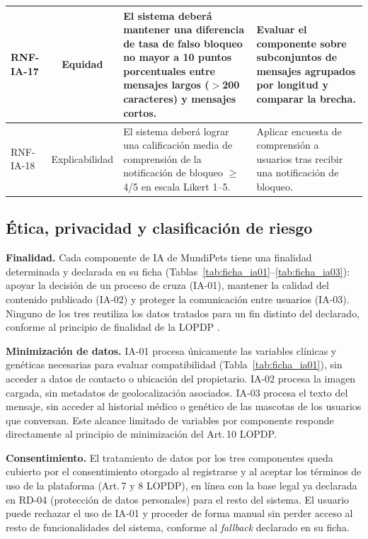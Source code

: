 \documentclass[journal,onecolumn]{IEEEtran}
\begin{document}
\begin{longtable}{|L{2.4cm}|c|L{7.2cm}|L{3.6cm}|}
	\hline
	RNF-IA-17 & Equidad & El sistema deberá mantener una diferencia de tasa de falso bloqueo no mayor a 10 puntos porcentuales entre mensajes largos ($>$200 caracteres) y mensajes cortos. & Evaluar el componente sobre subconjuntos de mensajes agrupados por longitud y comparar la brecha. \\
	\hline
	RNF-IA-18 & Explicabilidad & El sistema deberá lograr una calificación media de comprensión de la notificación de bloqueo $\geq$ 4/5 en escala Likert 1--5. & Aplicar encuesta de comprensión a usuarios tras recibir una notificación de bloqueo. \\
	\hline
\end{longtable}

\subsection{Ética, privacidad y clasificación de riesgo}
\label{sec:etica_ia}

\textbf{Finalidad.} Cada componente de IA de MundiPets tiene una finalidad determinada y
declarada en su ficha (Tablas~\ref{tab:ficha_ia01}--\ref{tab:ficha_ia03}): apoyar la decisión
de un proceso de cruza (IA-01), mantener la calidad del contenido publicado (IA-02) y proteger
la comunicación entre usuarios (IA-03). Ninguno de los tres reutiliza los datos tratados para
un fin distinto del declarado, conforme al principio de finalidad de la LOPDP \cite{lopdp2021}.

\textbf{Minimización de datos.} IA-01 procesa únicamente las variables clínicas y genéticas
necesarias para evaluar compatibilidad (Tabla~\ref{tab:ficha_ia01}), sin acceder a datos de
contacto o ubicación del propietario. IA-02 procesa la imagen cargada, sin metadatos de
geolocalización asociados. IA-03 procesa el texto del mensaje, sin acceder al historial médico
o genético de las mascotas de los usuarios que conversan. Este alcance limitado de variables
por componente responde directamente al principio de minimización del Art.\,10 LOPDP.

\textbf{Consentimiento.} El tratamiento de datos por los tres componentes queda cubierto por el
consentimiento otorgado al registrarse y al aceptar los términos de uso de la plataforma
(Art.\,7 y 8 LOPDP), en línea con la base legal ya declarada en RD-04 (protección de datos
personales) para el resto del sistema. El usuario puede rechazar el uso de IA-01 y proceder de
forma manual sin perder acceso al resto de funcionalidades del sistema, conforme al
\textit{fallback} declarado en su ficha.
\end{document}
